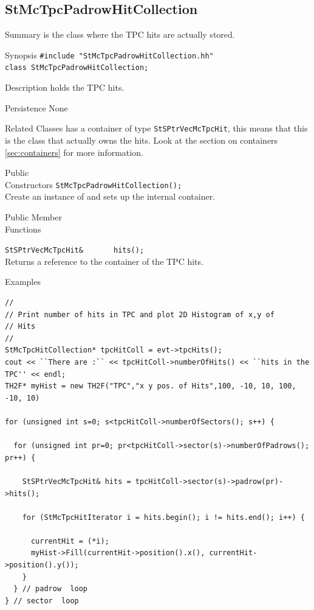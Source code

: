 \subsection{StMcTpcPadrowHitCollection}
 
\label{sec:StMcTpcPadrowHitCollection}
\begin{Entry}
\item[Summary]
     is the class where the TPC hits
    are actually stored.

\item[Synopsis]
    \verb+#include "StMcTpcPadrowHitCollection.hh"+\\
    \verb+class StMcTpcPadrowHitCollection;+\\

\item[Description]
     holds the TPC hits.

\item[Persistence]
    None

\item[Related Classes]
    has a container of type {\tt StSPtrVecMcTpcHit}, this means
    that this is the class that actually owns the hits.  Look
    at the section on containers \ref{sec:containers} for more
    information.    
\item[Public\\ Constructors]
    \verb+StMcTpcPadrowHitCollection();+\\
    Create an instance of 
    and sets up the internal container.

\item[Public Member\\ Functions]

    \verb+StSPtrVecMcTpcHit&       hits();+\\
    Returns a reference to the container of the TPC hits.
    
\item[Examples]
{\footnotesize
\begin{verbatim}
//
// Print number of hits in TPC and plot 2D Histogram of x,y of
// Hits
//  
StMcTpcHitCollection* tpcHitColl = evt->tpcHits();
cout << ``There are :`` << tpcHitColl->numberOfHits() << ``hits in the TPC'' << endl; 
TH2F* myHist = new TH2F("TPC","x y pos. of Hits",100, -10, 10, 100, -10, 10)

for (unsigned int s=0; s<tpcHitColl->numberOfSectors(); s++) {

  for (unsigned int pr=0; pr<tpcHitColl->sector(s)->numberOfPadrows(); pr++) {

    StSPtrVecMcTpcHit& hits = tpcHitColl->sector(s)->padrow(pr)->hits();

    for (StMcTpcHitIterator i = hits.begin(); i != hits.end(); i++) {

      currentHit = (*i);
      myHist->Fill(currentHit->position().x(), currentHit->position().y());
    }
  } // padrow  loop
} // sector  loop
\end{verbatim}
}%
\end{Entry}

